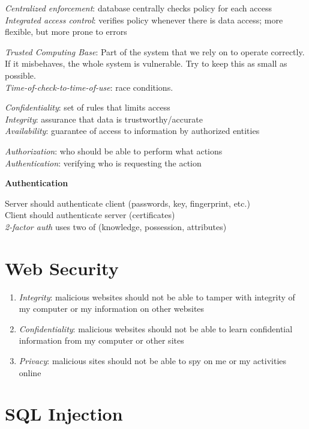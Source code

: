 \documentclass[10pt,landscape]{article}
\begin{document}
\begin{multicols}{3}
\textit{Centralized enforcement}: database centrally checks policy for each access \\
\textit{Integrated access control}: verifies policy whenever there is data access; more flexible, but more prone to errors

\textit{Trusted Computing Base}: Part of the system that we rely on to operate correctly. If it misbehaves, the whole system is vulnerable. Try to keep this as small as possible. \\
\textit{Time-of-check-to-time-of-use}: race conditions.

\textit{Confidentiality}: set of rules that limits access \\
\textit{Integrity}: assurance that data is trustworthy/accurate \\
\textit{Availability}: guarantee of access to information by authorized entities

\textit{Authorization}: who should be able to perform what actions \\
\textit{Authentication}: verifying who is requesting the action

\textbf{Authentication}

Server should authenticate client (passwords, key, fingerprint, etc.) \\
Client should authenticate server (certificates) \\
\textit{2-factor auth} uses two of (knowledge, possession, attributes)


\section{Web Security}

\begin{enumerate}
\item \textit{Integrity}: malicious websites should not be able to tamper with integrity of my computer or my information on other websites
\item \textit{Confidentiality}: malicious websites should not be able to learn confidential information from my computer or other sites
\item \textit{Privacy}: malicious sites should not be able to spy on me or my activities online
\end{enumerate}

\section{SQL Injection}


\end{multicols}
\end{document}
